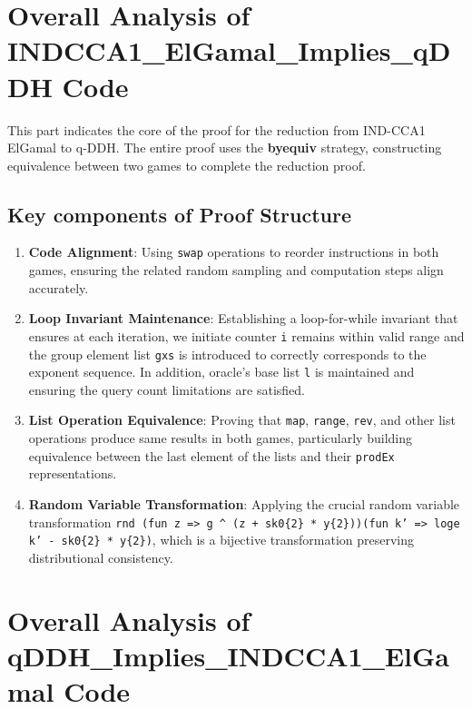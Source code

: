 \section{Overall Analysis of INDCCA1\_ElGamal\_Implies\_qDDH Code}

This part indicates the core of the proof for the reduction from IND-CCA1 ElGamal to q-DDH. The entire proof uses the \textbf{byequiv} strategy, constructing equivalence between two games to complete the reduction proof.

\subsection{Key components of Proof Structure}

\begin{enumerate}
\item \textbf{Code Alignment}: Using \texttt{swap} operations to reorder instructions in both games, ensuring the related random sampling and computation steps align accurately.

\item \textbf{Loop Invariant Maintenance}: Establishing a loop-for-while invariant that ensures at each iteration, we initiate counter \texttt{i} remains within valid range and the group element list \texttt{gxs} is introduced to correctly corresponds to the exponent sequence. In addition, oracle's base list \texttt{l} is maintained and ensuring the query count limitations are satisfied.


\item \textbf{List Operation Equivalence}: Proving that \texttt{map}, \texttt{range}, \texttt{rev}, and other list operations produce same results in both games, particularly building equivalence between the last element of the lists and their \texttt{prodEx} representations.

\item \textbf{Random Variable Transformation}: Applying the crucial random variable transformation \texttt{rnd (fun z => g \textasciicircum{} (z + sk0\{2\} * y\{2\}))(fun k' => loge k' - sk0\{2\} * y\{2\})}, which is a bijective transformation preserving distributional consistency.
\end{enumerate}








\section{Overall Analysis of qDDH\_Implies\_INDCCA1\_ElGamal Code}

